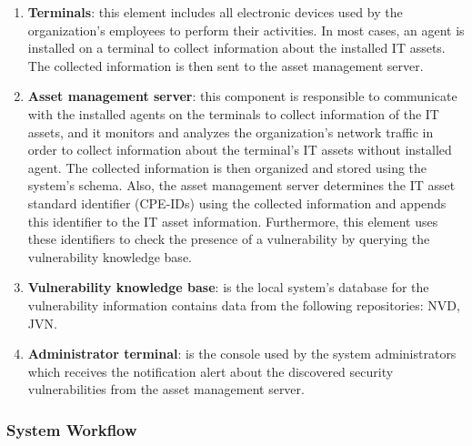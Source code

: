 \documentclass{llncs}
\begin{document}
 \begin{enumerate}
 \item \textbf{Terminals}: this element includes all electronic devices used by the organization's employees to perform their  activities. In most cases, an agent is installed on a terminal to collect information about the installed IT assets. The collected information is then sent to the asset management server.
 
 \item \textbf{Asset management server}: this component is responsible to communicate with the installed agents on the terminals to collect information of the IT assets, and it monitors and analyzes the organization's network traffic in order to collect information about the terminal's IT assets without installed agent. The collected information is then organized and stored using the system's schema. Also, the asset management server determines the IT asset standard identifier (CPE-IDs) using the collected information and appends this identifier to the  IT asset information. Furthermore, this element uses these identifiers to check the presence of a vulnerability by querying the vulnerability knowledge base.
 
 \item \textbf{Vulnerability knowledge base}: is the local system's database for the vulnerability information contains data from  the following repositories: NVD, JVN.
 
 
  \item \textbf{Administrator terminal}: is the console used by the system administrators which receives the notification alert about the discovered security vulnerabilities from the asset management server.     
 \end{enumerate}
 

\subsubsection{System Workflow }
\end{document}
